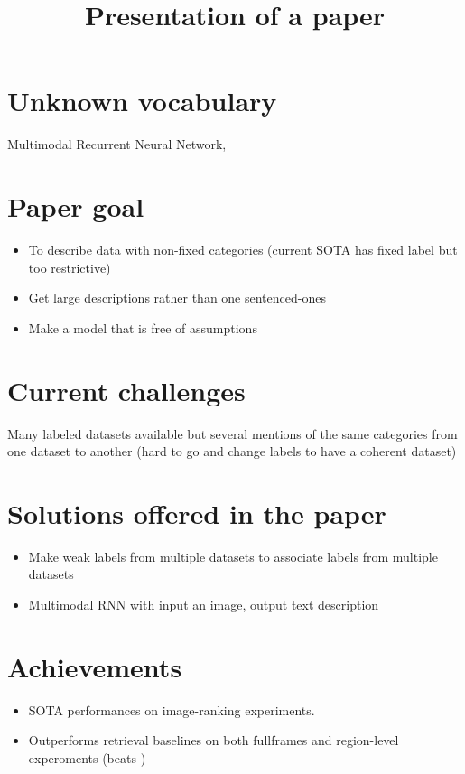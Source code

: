 \documentclass{article}
\title{Presentation of a paper}
\begin{document}
\maketitle

\section{Unknown vocabulary}
Multimodal Recurrent Neural Network,

\section{Paper goal}
\begin{itemize}
    \item To describe data with non-fixed categories (current SOTA has fixed label but too restrictive)
    \item Get large descriptions rather than one sentenced-ones
    \item Make a model that is free of assumptions
\end{itemize}

\section{Current challenges}
Many labeled datasets available but several mentions of the same categories from one dataset to another (hard to go and change labels to have a coherent dataset)

\section{Solutions offered in the paper}
\begin{itemize}
    \item Make weak labels from multiple datasets to associate labels from multiple datasets
    \item Multimodal RNN with input an image, output text description
\end{itemize}

\section{Achievements}
\begin{itemize}
    \item SOTA performances on image-ranking experiments.
    \item Outperforms retrieval baselines on both fullframes and region-level experoments (beats )
\end{itemize}
\end{document}
